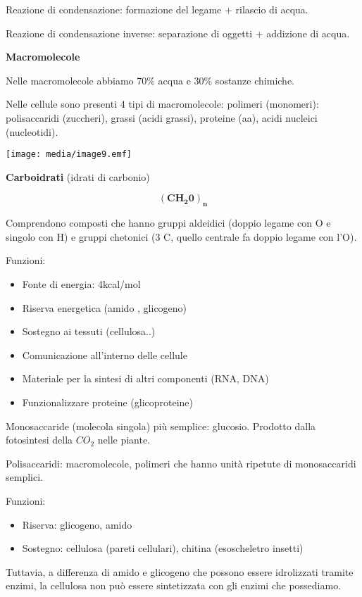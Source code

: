 Reazione di condensazione: formazione del legame + rilascio di acqua.

Reazione di condensazione inverse: separazione di oggetti + addizione di
acqua.

\textbf{Macromolecole}

Nelle macromolecole abbiamo 70\% acqua e 30\% sostanze chimiche.

Nelle cellule sono presenti 4 tipi di macromolecole: polimeri
(monomeri): polisaccaridi (zuccheri), grassi (acidi grassi), proteine
(aa), acidi nucleici (nucleotidi).

\texttt{[image: media/image9.emf]}

\textbf{Carboidrati} (idrati di carbonio)

\[\left( \mathbf{C}\mathbf{H}_{\mathbf{2}}\mathbf{0} \right)_{\mathbf{n}}\]

Comprendono composti che hanno gruppi aldeidici (doppio legame con O e
singolo con H) e gruppi chetonici (3 C, quello centrale fa doppio legame
con l'O).

Funzioni:

\begin{itemize}
\item
  Fonte di energia: 4kcal/mol
\item
  Riserva energetica (amido , glicogeno)
\item
  Sostegno ai tessuti (cellulosa..)
\item
  Comunicazione all'interno delle cellule
\item
  Materiale per la sintesi di altri componenti (RNA, DNA)
\item
  Funzionalizzare proteine (glicoproteine)
\end{itemize}

Monosaccaride (molecola singola) più semplice: glucosio. Prodotto dalla
fotosintesi della \(CO_{2}\) nelle piante.

Polisaccaridi: macromolecole, polimeri che hanno unità ripetute di
monosaccaridi semplici.

Funzioni:

\begin{itemize}
\item
  Riserva: glicogeno, amido
\item
  Sostegno: cellulosa (pareti cellulari), chitina (esoscheletro insetti)
\end{itemize}

Tuttavia, a differenza di amido e glicogeno che possono essere
idrolizzati tramite enzimi, la cellulosa non può essere sintetizzata con
gli enzimi che possediamo.

